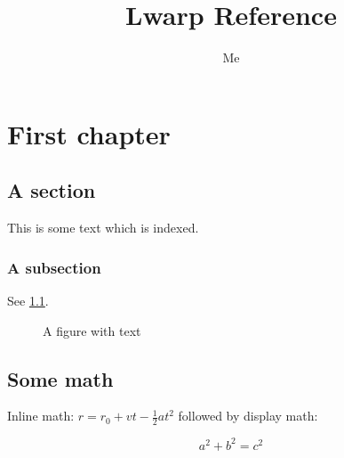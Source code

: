 \documentclass{book}
\title{Lwarp Reference}
\author{Me}
\begin{document}
\maketitle %

\tableofcontents %
\listoffigures

\chapter{First chapter}
\section{A section}

This is some text which is indexed.

\subsection{A subsection}

See \cref{fig:withtext}.

\begin{figure}
	\begin{center}
		\fbox{\textcolor{blue!50!green}{Text in a figure.}}
		\caption{A figure with text\label{fig:withtext}}
	\end{center}
\end{figure}

\section{Some math}

Inline math: $r = r_0 + vt - \frac{1}{2}at^2$
followed by display math:

\begin{equation}
a^2 + b^2 = c^2
\end{equation}



\begin{warpprint} %
	\cleardoublepage %
\end{warpprint}

\ForceHTMLPage 	%
\ForceHTMLTOC 	%
\printindex
\end{document}
